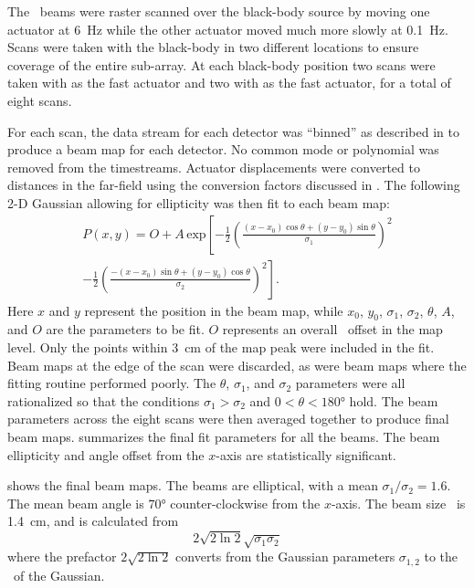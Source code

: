 The \Imager\ beams were raster scanned over the black-body source by moving one actuator at \SI{6}{\hertz} while the other actuator moved much more slowly at \SI{0.1}{\hertz}.
Scans were taken with the black-body in two different locations to ensure coverage of the entire sub-array.
At each black-body position two scans were taken with  as the fast actuator and two with  as the fast actuator, for a total of eight scans.

For each scan, the data stream for each detector was ``binned'' as described in  to produce a beam map for each detector.
No common mode or polynomial was removed from the timestreams.
Actuator displacements were converted to distances in the far-field using the conversion factors discussed in .
The following 2-D Gaussian allowing for ellipticity was then fit to each beam map:
\begin{multline}
  P(x,y) = O + A \, \text{exp} \left[  - \frac{1}{2} \left( \frac{ (x-x_0) \cos{\theta} + (y-y_0) \sin{\theta}}{\sigma_1} \right)^2 \right. \\ 
                              \left. - \frac{1}{2} \left( \frac{-(x-x_0) \sin{\theta} + (y-y_0) \cos{\theta}}{\sigma_2} \right)^2
                       \right] .
\end{multline}
Here $x$ and $y$ represent the position in the beam map, while $x_0$, $y_0$, $\sigma_1$, $\sigma_2$, $\theta$, $A$, and $O$ are the parameters to be fit.
$O$ represents an overall \DC\ offset in the map level.
Only the points within \SI{3}{\cm} of the map peak were included in the fit.
Beam maps at the edge of the scan were discarded, as were beam maps where the fitting routine performed poorly. %
The $\theta$, $\sigma_1$, and $\sigma_2$ parameters were all rationalized so that the conditions $\sigma_1 > \sigma_2$ and $0 < \theta < \ang{180}$ hold.
The beam parameters across the eight scans were then averaged together to produce final beam maps.
 summarizes the final fit parameters for all the beams.
The beam ellipticity and angle offset from the $x$-axis are statistically significant.

 shows the final beam maps.
The beams are elliptical, with a mean $\sigma_1 / \sigma_2 = 1.6$.
The mean beam angle is $\ang{70}$ counter-clockwise from the $x$-axis.
The beam size \FWHM\ is \SI{1.4}{\cm}, and is calculated from
\begin{equation}
  2 \sqrt{2 \ln{2}} \sqrt{\sigma_1 \sigma_2}
\end{equation}
where the prefactor $2 \sqrt{2 \ln{2}}$ converts from the Gaussian parameters $\sigma_{1,2}$ to the \FWHM\ of the Gaussian.

